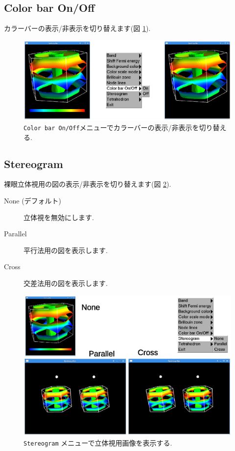 \documentclass[12pt]{jarticle}
\begin{document}
\subsection{Color bar On/Off}

カラーバーの表示/非表示を切り替えます(図 \ref{fig_colorbar}). 

\begin{figure}[!ht]
  \includegraphics[width=17cm]{figs/colorbar.eps}
  \caption{\texttt{Color bar On/Off}メニューでカラーバーの表示/非表示を切り替える.}
  \label{fig_colorbar}
\end{figure}

\subsection{Stereogram}

裸眼立体視用の図の表示/非表示を切り替えます(図 \ref{fig_stereogram}). 
\begin{description}
\item[None (デフォルト)] 立体視を無効にします. 
\item[Parallel] 平行法用の図を表示します. 
\item[Cross] 交差法用の図を表示します. 
\end{description}

\begin{figure}[!ht]
  \includegraphics[width=17cm]{figs/stereogram.eps}
  \caption{\texttt{Stereogram} メニューで立体視用画像を表示する.}
  \label{fig_stereogram}
\end{figure}
\end{document}

